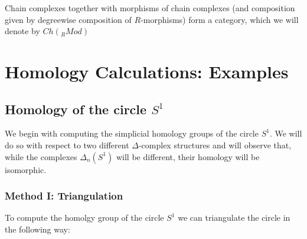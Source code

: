 \documentclass[11pt,a4paper]{report}
\begin{document}

        Chain complexes together with morphisms of chain complexes (and composition given by
        degreewise composition of $R$-morphisms) form a category, which we will denote by $Ch(_RMod)$

		 \section{Homology Calculations: Examples}\label{homology_ex}

		 \subsection{Homology of the circle $ S^1$}
		 We begin with computing the simplicial homology groups of the circle $S^1$. We will do so with respect to two different
                $\Delta$-complex structures and will observe that, while the complexes $\Delta_n(S^1)$ will be different, their homology will be isomorphic.
                
                \subsubsection{Method I: Triangulation}
                To compute the homolgy group of the circle $S^1$ we can triangulate the circle in the following way: \\
\end{document}
